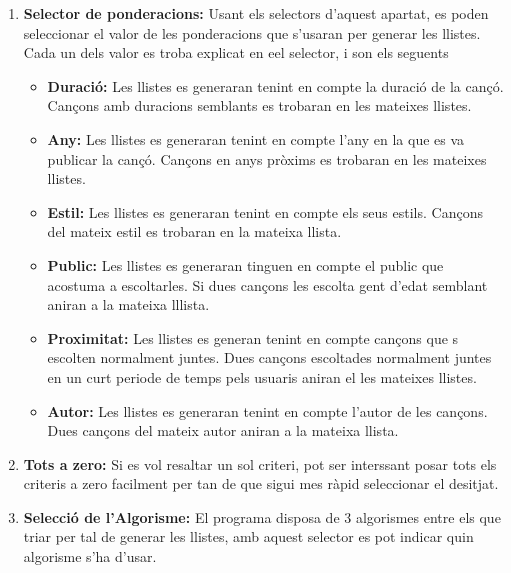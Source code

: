 \documentclass[letterpaper,10pt,oneside]{sphinxmanual}
\begin{document}
\begin{enumerate}
\item {} 
\textbf{Selector de ponderacions:} Usant els selectors d'aquest apartat, es poden seleccionar el valor de les ponderacions que s'usaran per generar les llistes. Cada un dels valor es troba explicat en eel selector, i son els seguents
\begin{itemize}
\item {} 
\textbf{Duració:} Les llistes es generaran tenint en compte la duració de la cançó. Cançons amb duracions semblants es trobaran en les mateixes llistes.

\item {} 
\textbf{Any:} Les llistes es generaran tenint en compte l'any en la que es va publicar la cançó. Cançons en anys pròxims es trobaran en les mateixes llistes.

\item {} 
\textbf{Estil:} Les llistes es generaran tenint en compte els seus estils. Cançons del mateix estil es trobaran en la mateixa llista.

\item {} 
\textbf{Public:} Les llistes es generaran tinguen en compte el public que acostuma a escoltarles. Si dues cançons les escolta gent d'edat semblant aniran a la mateixa lllista.

\item {} 
\textbf{Proximitat:}  Les llistes es generan tenint en compte cançons que s escolten normalment juntes. Dues cançons escoltades normalment juntes en un curt periode de temps pels usuaris aniran el les mateixes llistes.

\item {} 
\textbf{Autor:} Les llistes es generaran tenint en compte l'autor de les cançons. Dues cançons del mateix autor aniran a la mateixa llista.

\end{itemize}

\item {} 
\textbf{Tots a zero:} Si es vol resaltar un sol criteri, pot ser interssant posar tots els criteris a zero facilment per tan de que sigui mes ràpid seleccionar el desitjat.

\item {} 
\textbf{Selecció de l'Algorisme:} El programa disposa de 3 algorismes entre els que triar per tal de generar les llistes, amb aquest selector es pot indicar quin algorisme s'ha d'usar.

\end{enumerate}
\end{document}
